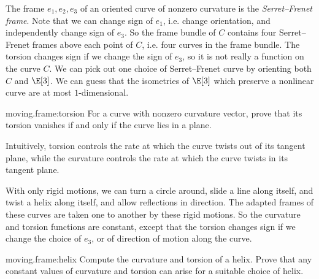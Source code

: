 The frame \(e_1, e_2, e_3\) of an oriented curve of nonzero curvature is the \emph{Serret--Frenet frame}.
Note that we can change sign of \(e_1\), i.e. change orientation, and independently change sign of \(e_3\).
So the frame bundle of \(C\) contains four Serret--Frenet frames above each point of \(C\), i.e. four curves in the frame bundle.
The torsion changes sign if we change the sign of \(e_3\), so it is not really a function on the curve \(C\).
We can pick out one choice of Serret--Frenet curve by orienting both \(C\) and \(\E[3]\).
We can guess that the isometries of \(\E[3]\) which preserve a nonlinear curve are at most \(1\)-dimensional.
\begin{problem}{moving.frame:torsion}
For a curve with nonzero curvature vector, prove that its torsion vanishes if and only if the curve lies in a plane.
\end{problem}
\begin{example}
Intuitively, torsion controls the rate at which the curve twists out of its tangent plane, while the curvature controls the rate at which the curve twists in its tangent plane.
\end{example}
\begin{example}
With only rigid motions, we can turn a circle around, slide a line along itself, and twist a helix along itself, and allow reflections in direction.
The adapted frames of these curves are taken one to another by these rigid motions.
So the curvature and torsion functions are constant, except that the torsion changes sign if we change the choice of \(e_3\), or of direction of motion along the curve.
\end{example}
\begin{problem}{moving.frame:helix}
Compute the curvature and torsion of a helix.
Prove that any constant values of curvature and torsion can arise for a suitable choice of helix.
\end{problem}
